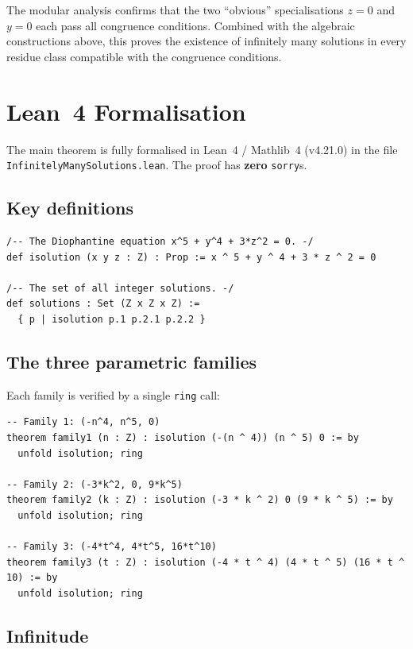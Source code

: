 \documentclass[12pt,a4paper]{article}
\theoremstyle{definition}
\begin{document}
The modular analysis confirms that the two ``obvious'' specialisations $z = 0$
and $y = 0$ each pass all congruence conditions.  Combined with the algebraic
constructions above, this proves the existence of infinitely many solutions
in every residue class compatible with the congruence conditions.

\section{Lean~4 Formalisation}\label{sec:lean}

The main theorem is fully formalised in Lean~4 / Mathlib~4 (v4.21.0) in the file
\texttt{InfinitelyManySolutions.lean}.  The proof has \textbf{zero} \texttt{sorry}s.

\subsection{Key definitions}

\begin{lstlisting}[language=Lean4]
/-- The Diophantine equation x^5 + y^4 + 3*z^2 = 0. -/
def isolution (x y z : Z) : Prop := x ^ 5 + y ^ 4 + 3 * z ^ 2 = 0

/-- The set of all integer solutions. -/
def solutions : Set (Z x Z x Z) :=
  { p | isolution p.1 p.2.1 p.2.2 }
\end{lstlisting}

\subsection{The three parametric families}

Each family is verified by a single \texttt{ring} call:

\begin{lstlisting}[language=Lean4]
-- Family 1: (-n^4, n^5, 0)
theorem family1 (n : Z) : isolution (-(n ^ 4)) (n ^ 5) 0 := by
  unfold isolution; ring

-- Family 2: (-3*k^2, 0, 9*k^5)
theorem family2 (k : Z) : isolution (-3 * k ^ 2) 0 (9 * k ^ 5) := by
  unfold isolution; ring

-- Family 3: (-4*t^4, 4*t^5, 16*t^10)
theorem family3 (t : Z) : isolution (-4 * t ^ 4) (4 * t ^ 5) (16 * t ^ 10) := by
  unfold isolution; ring
\end{lstlisting}

\subsection{Infinitude}
\end{document}
